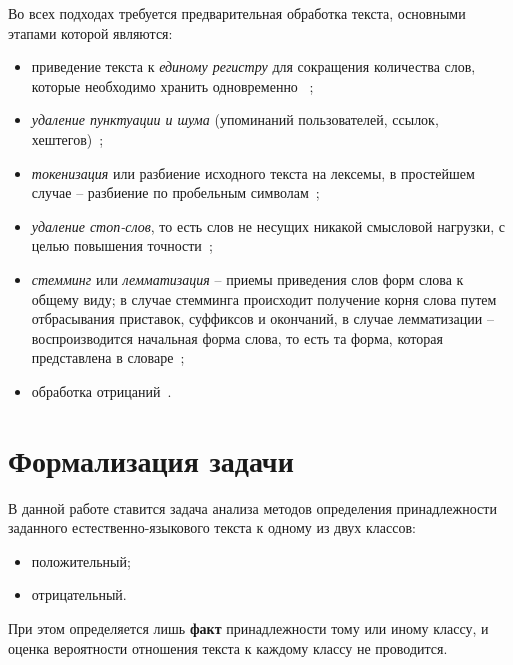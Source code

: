 Во всех подходах требуется предварительная обработка текста, основными этапами
которой являются:
\begin{itemize}
    \item приведение текста к \textit{единому регистру} для сокращения
        количества слов, которые необходимо хранить одновременно
       ~\cite{article11};
    \item \textit{удаление пунктуации и шума} (упоминаний пользователей, ссылок,
        хештегов)~\cite{article11};
    \item \textit{токенизация} или разбиение исходного текста на лексемы, в простейшем
        случае -- разбиение по пробельным символам~\cite{article12};
    \item \textit{удаление стоп-слов}, то есть слов не несущих никакой смысловой
        нагрузки, с целью повышения точности~\cite{article11};
    \item \textit{стемминг} или \textit{лемматизация} -- приемы приведения слов
        форм слова к общему виду; в случае стемминга происходит получение корня
        слова путем отбрасывания приставок, суффиксов и окончаний, в случае
        лемматизации -- воспроизводится начальная форма слова, то есть та форма,
        которая представлена в словаре~\cite{article11};
    \item обработка отрицаний~\cite{article13}.
\end{itemize}

\section{Формализация задачи}

В данной работе ставится задача анализа методов определения принадлежности
заданного естественно-языкового текста к одному из двух классов:
\begin{itemize}
    \item положительный;
    \item отрицательный.
\end{itemize}

При этом определяется лишь \textbf{факт} принадлежности тому или иному
классу, и оценка вероятности отношения текста к каждому классу не проводится.

